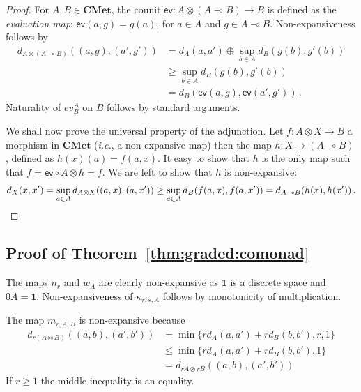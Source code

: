 \documentclass[a4paper,UKenglish,cleveref, autoref, thm-restate]{lipics-v2021}
\newcommand{\ie}{\textit{i.e.}}
\newcommand{\lol}{\mathbin{\multimap}}
\newcommand{\cat}[1]{\mathbf{#1}}
\newcommand{\CMet}{\cat{CMet}}
\newcommand{\mprod}{\otimes}
\newcommand{\mexp}{\lol}
\newcommand{\unit}{\mathbf{1}}
\newcommand{\scaling}{}
\begin{document}
\begin{proof}
For $A,B \in \CMet$, the counit $\mathsf{ev} \colon A \mprod (A \mexp B) \to B$ is defined as the \emph{evaluation map}: $\mathsf{ev}(a, g) = g(a)$, for 
$a \in A$ and $g \in A \mexp B$. Non-expansiveness follows by
\begin{align*}
    d_{A \mprod (A \mexp B)}((a,g),(a',g')) 
    &= d_A(a,a') \oplus \sup_{b \in A} d_B(g(b), g'(b)) \\
    &\geq \sup_{b \in A} d_B(g(b), g'(b)) \\
    &= d_B(\mathsf{ev}(a, g), \mathsf{ev}(a', g')) \,.
\end{align*}
Naturality of $ev^A_B$ on $B$ follows by standard arguments.

We shall now prove the universal property of the adjunction. 
Let $f \colon A \mprod X \to B$ a morphism in $\CMet$ (\ie, a non-expansive map) then the map $h \colon X \to (A \mexp B)$, defined as $h(x)(a) = f(a,x)$. It easy to show that $h$ is the only map such that $f = \mathsf{ev}\circ A\mprod h = f$.
We are left to show that $h$ is non-expansive:
\begin{equation*}
    d_X(x,x') 
    = \sup_{a \in A} d_{A \mprod X}((a,x),(a,x')) %
    \geq \sup_{a \in A} d_{B}(f(a,x),f(a,x')) %
    = d_{A \mexp B}(h(x),h(x')) \,.
    \qedhere
\end{equation*}
\end{proof}

\subsection*{Proof of Theorem~\ref{thm:graded:comonad}}
The maps $n_{r}$ and $w_A$ are clearly non-expansive 
as $\unit$ is a discrete space and $0 \scaling A = \unit$.
Non-expansiveness of $\kappa_{r,s,A}$ follows by monotonicity
of multiplication.

The map $m_{r,A,B}$ is non-expansive because 
\begin{align*}
 d_{r(A\mprod B)} ((a,b), (a',b')) 
 & = \min\{rd_A(a,a') + rd_B(b,b'), r, 1\} \\
 & \leq \min\{rd_A(a,a') + rd_B(b,b'), 1\} \\
 & = d_{rA \mprod rB}((a,b), (a',b'))
\end{align*}
If $r \geq 1$ the middle inequality is an equality.
\end{document}
